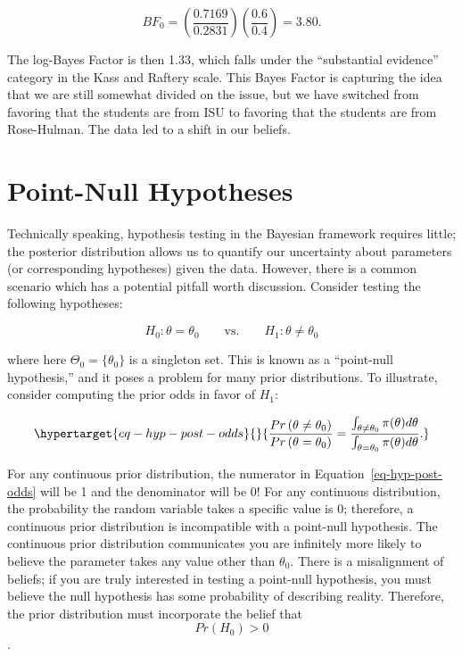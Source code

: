 \documentclass[
  letterpaper,
  DIV=11,
  numbers=noendperiod]{scrreprt}
\theoremstyle{definition}
\theoremstyle{plain}
\theoremstyle{definition}
\theoremstyle{remark}
\begin{document}
\[BF_{0} = \left(\frac{0.7169}{0.2831}\right)\left(\frac{0.6}{0.4}\right) = 3.80.\]

The log-Bayes Factor is then 1.33, which falls under the ``substantial
evidence'' category in the Kass and Raftery scale. This Bayes Factor is
capturing the idea that we are still somewhat divided on the issue, but
we have switched from favoring that the students are from ISU to
favoring that the students are from Rose-Hulman. The data led to a shift
in our beliefs.

\hypertarget{point-null-hypotheses}{%
\section{Point-Null Hypotheses}\label{point-null-hypotheses}}

Technically speaking, hypothesis testing in the Bayesian framework
requires little; the posterior distribution allows us to quantify our
uncertainty about parameters (or corresponding hypotheses) given the
data. However, there is a common scenario which has a potential pitfall
worth discussion. Consider testing the following hypotheses:

\[H_0: \theta = \theta_0 \qquad \text{vs.} \qquad H_1: \theta \neq \theta_0\]

where here \(\Theta_0 = \{\theta_0\}\) is a singleton set. This is known
as a ``point-null hypothesis,'' and it poses a problem for many prior
distributions. To illustrate, consider computing the prior odds in favor
of \(H_1\):

\begin{equation}\protect\hypertarget{eq-hyp-post-odds}{}{\frac{Pr\left(\theta \neq \theta_0\right)}{Pr\left(\theta = \theta_0\right)} = \frac{\int_{\theta \neq \theta_0}^{} \pi(\theta) d\theta}{\int_{\theta = \theta_0}^{} \pi(\theta) d\theta}.}\label{eq-hyp-post-odds}\end{equation}

For any continuous prior distribution, the numerator in
Equation~\ref{eq-hyp-post-odds} will be 1 and the denominator will be 0!
For any continuous distribution, the probability the random variable
takes a specific value is 0; therefore, a continuous prior distribution
is incompatible with a point-null hypothesis. The continuous prior
distribution communicates you are infinitely more likely to believe the
parameter takes any value other than \(\theta_0\). There is a
misalignment of beliefs; if you are truly interested in testing a
point-null hypothesis, you must believe the null hypothesis has some
probability of describing reality. Therefore, the prior distribution
must incorporate the belief that \[Pr\left(H_0\right) > 0\].
\end{document}
